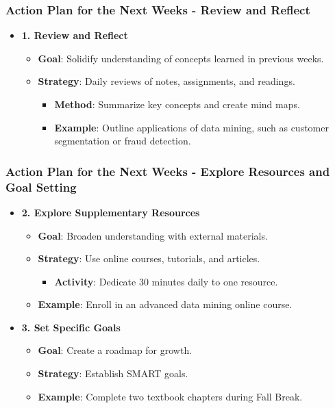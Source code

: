 \documentclass[aspectratio=169]{beamer}
\begin{document}
\begin{frame}[fragile]
    \frametitle{Action Plan for the Next Weeks - Review and Reflect}
    \begin{itemize}
        \item \textbf{1. Review and Reflect}
        \begin{itemize}
            \item \textbf{Goal}: Solidify understanding of concepts learned in previous weeks.
            \item \textbf{Strategy}: Daily reviews of notes, assignments, and readings.
            \begin{itemize}
                \item \textbf{Method}: Summarize key concepts and create mind maps.
                \item \textbf{Example}: Outline applications of data mining, such as customer segmentation or fraud detection.
            \end{itemize}
        \end{itemize}
    \end{itemize}
\end{frame}

\begin{frame}[fragile]
    \frametitle{Action Plan for the Next Weeks - Explore Resources and Goal Setting}
    \begin{itemize}
        \item \textbf{2. Explore Supplementary Resources}
        \begin{itemize}
            \item \textbf{Goal}: Broaden understanding with external materials.
            \item \textbf{Strategy}: Use online courses, tutorials, and articles.
            \begin{itemize}
                \item \textbf{Activity}: Dedicate 30 minutes daily to one resource.
            \end{itemize}
            \item \textbf{Example}: Enroll in an advanced data mining online course.
        \end{itemize}
        
        \item \textbf{3. Set Specific Goals}
        \begin{itemize}
            \item \textbf{Goal}: Create a roadmap for growth.
            \item \textbf{Strategy}: Establish SMART goals.
            \item \textbf{Example}: Complete two textbook chapters during Fall Break.
        \end{itemize}
    \end{itemize}
\end{frame}
\end{document}
